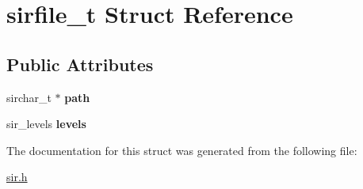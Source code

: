 \hypertarget{structsirfile__t}{}\section{sirfile\+\_\+t Struct Reference}
\label{structsirfile__t}
\subsection*{Public Attributes}
\begin{DoxyCompactItemize}
\item 
sirchar\+\_\+t $\ast$ {\bfseries path}\hypertarget{structsirfile__t_af173d11b5f2fdba808f94ae69925f8cf}{}\label{structsirfile__t_af173d11b5f2fdba808f94ae69925f8cf}

\item 
sir\+\_\+levels {\bfseries levels}\hypertarget{structsirfile__t_a5742941511fe4225ee0a0656dad69bef}{}\label{structsirfile__t_a5742941511fe4225ee0a0656dad69bef}

\end{DoxyCompactItemize}


The documentation for this struct was generated from the following file\+:\begin{DoxyCompactItemize}
\item 
\hyperlink{sir_8h}{sir.\+h}\end{DoxyCompactItemize}

